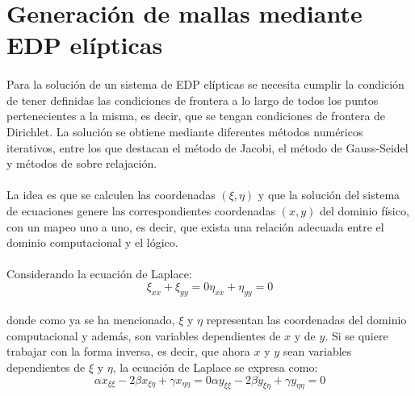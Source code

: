 \documentclass[letterpaper, openright, 12pt]{book}
\begin{document}
		\section{Generación de mallas mediante EDP elípticas}
			\paragraph*{}
				Para la solución de un sistema de EDP elípticas se necesita cumplir la condición de tener definidas las condiciones de frontera a lo largo de todos los puntos pertenecientes a la misma, es decir, que se tengan condiciones de frontera de Dirichlet.
				La solución se obtiene mediante diferentes métodos numéricos iterativos, entre los que destacan el método de Jacobi, el método de Gauss-Seidel y métodos de sobre relajación.
				
			\paragraph*{}
				La idea es que se calculen las coordenadas $(\xi, \eta)$ y que la solución del sistema de ecuaciones genere las correspondientes coordenadas $(x, y)$ del dominio físico, con un mapeo uno a uno, es decir, que exista una relación adecuada entre el dominio computacional y el lógico.
				
			\paragraph*{}
				Considerando la ecuación de Laplace:
				\begin{subequations}
					\begin{equation}
						\xi_{xx} + \xi_{yy} = 0
					\end{equation}
					\begin{equation}
						\eta_{xx} + \eta_{yy} = 0
					\end{equation}
					\label{ec-laplace}
				\end{subequations}\\
				donde como ya se ha mencionado, $\xi$ y $\eta$ representan las coordenadas del dominio computacional y además, son variables dependientes de $x$ y de $y$. Si se quiere trabajar con la forma inversa, es decir, que ahora $x$ y $y$ sean variables dependientes de $\xi$ y $\eta$, la ecuación  de Laplace se expresa como:
				\begin{subequations}
					\begin{equation}
						\alpha x_{\xi \xi} - 2\beta x_{\xi \eta} + \gamma x_{\eta \eta} = 0
					\end{equation}
					\begin{equation}
						\alpha y_{\xi \xi} - 2\beta y_{\xi \eta} + \gamma y_{\eta \eta} = 0
					\end{equation}
					\label{ec-laplace-invertida}
				\end{subequations}\\
				
\end{document}
